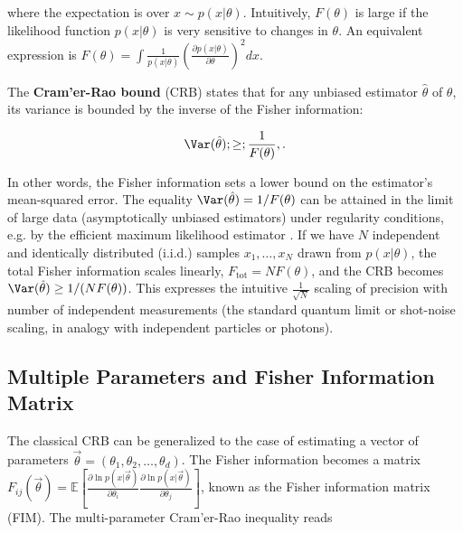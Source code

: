 where the expectation is over $x\sim p(x|\theta)$. Intuitively, $F(\theta)$ is large if the likelihood function $p(x|\theta)$ is very sensitive to changes in $\theta$. An equivalent expression is $F(\theta) = \int \frac{1}{p(x|\theta)}\left(\frac{\partial p(x|\theta)}{\partial \theta}\right)^2 dx$.



The \textbf{Cram'er-Rao bound} (CRB) states that for any unbiased estimator $\hat{\theta}$ of $\theta$, its variance is bounded by the inverse of the Fisher information:

\begin{equation}

\Var(\hat{\theta}) ;\ge; \frac{1}{F(\theta)} ,.

\label{eq:CRB-classical}

\end{equation}

In other words, the Fisher information sets a lower bound on the
estimator’s mean-squared error. The equality $\Var(\hat{\theta}) =
1/F(\theta)$ can be attained in the limit of large data
(asymptotically unbiased estimators) under regularity conditions,
e.g. by the efficient maximum likelihood estimator \cite{Kay1993}. If
we have $N$ independent and identically distributed (i.i.d.) samples
$x_1,\dots,x_N$ drawn from $p(x|\theta)$, the total Fisher information
scales linearly, $F_{\text{tot}} = N F(\theta)$, and the CRB becomes
$\Var(\hat{\theta}) \ge 1/(N F(\theta))$. This expresses the intuitive
$\frac{1}{\sqrt{N}}$ scaling of precision with number of independent
measurements (the standard quantum limit or shot-noise scaling, in
analogy with independent particles or photons).



\subsection{Multiple Parameters and Fisher Information Matrix}



The classical CRB can be generalized to the case of estimating a
vector of parameters $\vec{\theta} =
(\theta_1,\theta_2,\dots,\theta_d)$. The Fisher information becomes a
matrix $F_{ij}(\vec{\theta}) = \mathbb{E}\left[ \frac{\partial \ln
    p(x|\vec{\theta})}{\partial \theta_i}\frac{\partial \ln
    p(x|\vec{\theta})}{\partial \theta_j} \right]$,
known as the
Fisher information matrix (FIM). The multi-parameter Cram'er-Rao
inequality reads

